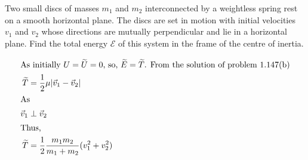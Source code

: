 \item Two small discs of masses \( m_1 \) and \( m_2 \) interconnected by a weightless spring rest on a smooth horizontal plane. The discs are set in motion with initial velocities \( v_1 \) and \( v_2 \) whose directions are mutually perpendicular and lie in a horizontal plane. Find the total energy \( \mathcal{E} \) of this system in the frame of the centre of inertia.\begin{solution}
    \begin{align*}
        \intertext{As initially \(U = \tilde{U} = 0\), so, \(\tilde{E} = \tilde{T}\). From the solution of problem 1.147(b)}
        \tilde{T} &= \dfrac{1}{2} \mu |\vec{v}_1 - \vec{v}_2|\\
        \intertext{As}
        \vec{v}_1 &\perp \vec{v}_2\\
        \intertext{Thus,}
        \tilde{T} &= \dfrac{1}{2} \dfrac{m_1 m_2}{m_1 + m_2} (v_1^2 + v_2^2)
    \end{align*}
\end{solution}